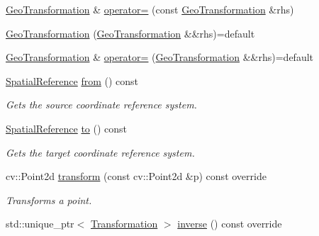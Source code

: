 \begin{DoxyCompactItemize}
\item 
\hyperlink{classdg_1_1deepcore_1_1geometry_1_1_geo_transformation}{Geo\+Transformation} \& \hyperlink{classdg_1_1deepcore_1_1geometry_1_1_geo_transformation_a85f49e823058ae4f1802412c44e3c2fd}{operator=} (const \hyperlink{classdg_1_1deepcore_1_1geometry_1_1_geo_transformation}{Geo\+Transformation} \&rhs)
\item 
\hyperlink{classdg_1_1deepcore_1_1geometry_1_1_geo_transformation_acee277c24e3c6391d84c191a364ba808}{Geo\+Transformation} (\hyperlink{classdg_1_1deepcore_1_1geometry_1_1_geo_transformation}{Geo\+Transformation} \&\&rhs)=default
\item 
\hyperlink{classdg_1_1deepcore_1_1geometry_1_1_geo_transformation}{Geo\+Transformation} \& \hyperlink{classdg_1_1deepcore_1_1geometry_1_1_geo_transformation_ad35340c77b4a22d10c196403ca30da65}{operator=} (\hyperlink{classdg_1_1deepcore_1_1geometry_1_1_geo_transformation}{Geo\+Transformation} \&\&rhs)=default
\item 
\hyperlink{classdg_1_1deepcore_1_1geometry_1_1_spatial_reference}{Spatial\+Reference} \hyperlink{classdg_1_1deepcore_1_1geometry_1_1_geo_transformation_a38e2d96b36aed7db3a87fca5b313b0aa}{from} () const 
\begin{DoxyCompactList}\small\item\em Gets the source coordinate reference system. \end{DoxyCompactList}\item 
\hyperlink{classdg_1_1deepcore_1_1geometry_1_1_spatial_reference}{Spatial\+Reference} \hyperlink{classdg_1_1deepcore_1_1geometry_1_1_geo_transformation_a1f0952b9e9d094c7702c9669a0b205e0}{to} () const 
\begin{DoxyCompactList}\small\item\em Gets the target coordinate reference system. \end{DoxyCompactList}\item 
cv\+::\+Point2d \hyperlink{classdg_1_1deepcore_1_1geometry_1_1_geo_transformation_ab5a6914031cdb5a6f2898195a810def0}{transform} (const cv\+::\+Point2d \&p) const override
\begin{DoxyCompactList}\small\item\em Transforms a point. \end{DoxyCompactList}\item 
std\+::unique\+\_\+ptr$<$ \hyperlink{structdg_1_1deepcore_1_1geometry_1_1_transformation}{Transformation} $>$ \hyperlink{classdg_1_1deepcore_1_1geometry_1_1_geo_transformation_abd77dc4ae76ac30094f4eccdcaf82635}{inverse} () const override

\end{DoxyCompactItemize}
